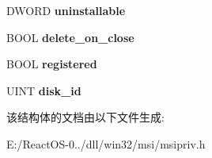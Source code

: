 \begin{DoxyCompactItemize}
D\+W\+O\+RD {\bfseries uninstallable}
\item 
\mbox{\label{structtag_m_s_i_p_a_t_c_h_i_n_f_o_acde67d5436292789b82d5f2538366ee4}} 
B\+O\+OL {\bfseries delete\+\_\+on\+\_\+close}
\item 
\mbox{\label{structtag_m_s_i_p_a_t_c_h_i_n_f_o_a3523c93ab055300d523855714ea7e66c}} 
B\+O\+OL {\bfseries registered}
\item 
\mbox{\label{structtag_m_s_i_p_a_t_c_h_i_n_f_o_ab4a4c530d625e2302e68a882ae81845c}} 
U\+I\+NT {\bfseries disk\+\_\+id}
\end{DoxyCompactItemize}


该结构体的文档由以下文件生成\+:\begin{DoxyCompactItemize}
\item 
E\+:/\+React\+O\+S-\/0../dll/win32/msi/msipriv.\+h\end{DoxyCompactItemize}

